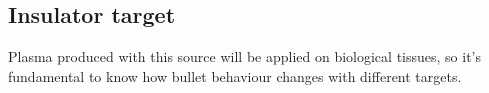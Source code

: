 \subsection{Insulator target}
Plasma produced with this source will be applied on biological tissues, so it's fundamental to know how bullet behaviour changes with different targets.

